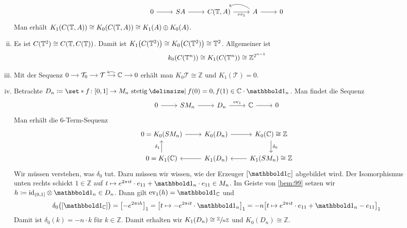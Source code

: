 \begin{beispiel}
\begin{enumerate}[(i)]
\[\begin{tikzcd}
				0 \rar & SA \rar &  C(\mathbb{T},A) \rar["ev_1"'] & A \lar[bend right] \rar & 0
			\end{tikzcd}
		\]
		Man erhält $K_1 \enbrace*{C(\mathbb{T},A)} \cong K_0 \enbrace*{C(\mathbb{T},A)} \cong K_1(A) \oplus K_0(A)$.
		\item Es ist $C(\mathbb{T}^2) \cong C \enbrace*{\mathbb{T}, C(\mathbb{T})}$.
		Damit ist $K_1\enbrace*{C(\mathbb{T}^2)} \cong K_0 \enbrace*{C(\mathbb{T}^2)} \cong \mathbb{T}^2$.
		Allgemeiner ist
		\[
			k_0 \enbrace*{C(\mathbb{T}^n)} \cong K_1 \enbrace*{C(\mathbb{T}^n )} \cong \mathbb{Z}^{2^{n-1}}
		\]
		\item Mit der Sequenz \(
			\begin{tikzcd}[cramped,sep=small]
				0 \rar & \mathcal{T}_0 \rar & \mathcal{T} \rar & \mathbb{C} \lar[bend right] \rar & 0
			\end{tikzcd}
		\)
		erhält man $K_0\mathcal{T} \cong \mathbb{Z}$ und $K_1(\mathcal{T}) =0$.
		\item Betrachte $D_n \coloneqq \set*{f \colon [0,1] \to M_n \text{ stetig} \given f(0) = 0, f(1) \in \mathbb{C} \cdot \ind_n }$.
		Man findet die Sequenz
		\[
			\begin{tikzcd}
				0 \rar & SM_n\rar & D_n \rar["\ev_1"] & \mathbb{C} \rar & 0
			\end{tikzcd}
		\]
		Man erhält die 6-Term-Sequenz
		\[
			\begin{tikzcd}
				0=K_0(SM_n) \rar & K_0(D_n) \rar & K_0(\mathbb{C}) \dar["\delta_0"] \cong \mathbb{Z} \\
				0=K_1(\mathbb{C}) \uar["\delta_1"] & K_1(D_n) \lar & K_1(SM_n) \lar \cong \mathbb{Z}
			\end{tikzcd}
		\]
		Wir müssen verstehen, was $\delta_0$ tut.
		Dazu müssen wir wissen, wie der Erzeuger $\benbrace*{\ind_\mathbb{C}}$ abgebildet wird.
		Der Isomorphismus unten rechts schickt $1 \in \mathbb{Z}$ auf $t \mapsto e^{2 \pi i t} \cdot e_{11} + \ind_n \cdot e_{11} \in M_n$.
		Im Geiste von \autoref{bem:99} setzen wir $h \coloneqq {\id_{(0,1]}} \otimes \ind_n \in D_n$.
		Dann gilt $\ev_1(h)= \ind_\mathbb{C}$ und 
		\[
			\delta_0 \enbrace[\big]{\benbrace*{\ind_\mathbb{C}}} = \benbrace*{- e^{2 \pi i h}}_1 = \benbrace*{t \mapsto - e^{2 \pi i t} \cdot \ind_n}_1 = - n \benbrace*{t \mapsto e^{2 \pi i t} \cdot e_{11} + \ind_n - e_{11}}_1
		\]
		Damit ist $\delta_0(k) = - n \cdot k$ für $k \in \mathbb{Z}$.
		Damit erhalten wir $K_1(D_n) \cong \sfrac{\mathbb{Z}}{n \mathbb{Z}}$ und $K_0(D_n) \cong \mathbb{Z}$.
	\end{enumerate}
\end{beispiel}

